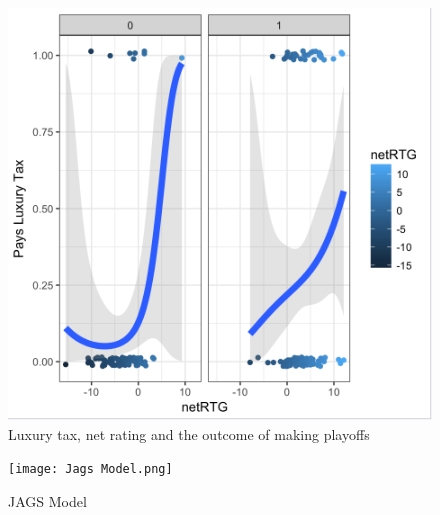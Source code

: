\documentclass[12pt,english]{article}
\begin{document}
\begin{figure}[ht]
\caption{Luxury tax, net rating and the outcome of making playoffs }
\includegraphics[scale=0.5]{Initial3.png}
\centering
\end{figure}

\begin{figure}[ht]
\caption{JAGS Model}
\texttt{[image: Jags Model.png]}
\centering
\end{figure}
\end{document}
